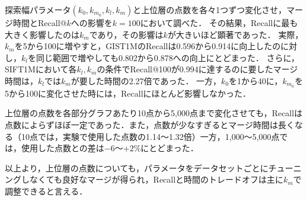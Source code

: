 \documentclass[submit,techrep,noauthor]{ipsj}
\begin{document}
探索幅パラメータ$(k_0, k_{m_0}, k_l, k_m)$と上位層の点数を各々1つずつ変化させ，マージ時間とRecall@$k$への影響を$k=100$において調べた．
その結果，Recallに最も大きく影響したのは$k_m$であり，その影響は$k$が大きいほど顕著であった．
実際，$k_m$を5から100に増やすと，GIST1MのRecallは0.596から0.914に向上したのに対し，$k_l$を同じ範囲で増やしても0.802から0.878への向上にとどまった．
さらに，SIFT1Mにおいて各$k_l, k_m$の条件でRecall@100が0.994に達するのに要したマージ時間は，$k_l$では$k_m$が要した時間の2.27倍であった．
一方，$k_0$を1から40に，$k_{m_0}$を5から100に変化させた時には，Recallにほとんど影響しなかった．


上位層の点数を各部分グラフあたり10点から5,000点まで変化させても，Recallは点数によらずほぼ一定であった．また，点数が少なすぎるとマージ時間は長くなる（10点では，実験で使用した点数の1.14〜1.32倍）一方，1,000〜5,000点では，使用した点数との差は$-6$〜$+2$\%にとどまった．


以上より，上位層の点数についても，パラメータをデータセットごとにチューニングしなくても良好なマージが得られ，Recallと時間のトレードオフは主に$k_m$で調整できると言える．
\end{document}
